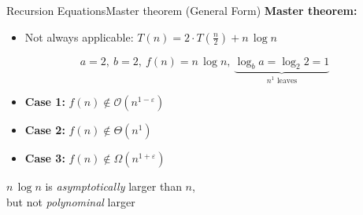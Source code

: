 \begin{frame}{Recursion Equations}{Master theorem (General Form)}
  \textbf{Master theorem:}
  \begin{itemize}
    \item
      Not always applicable:
      {\color{Mittel-Blau}$T(n) = 2 \cdot T(\frac{n}{2}) + n \, \log n$}
  \end{itemize}
  \vspace{1.0em}
  \begin{displaymath}
    a = 2, ~ b = 2, ~ f(n) = n \, \log n, ~
    \underbrace{\log_b a = \log_2 2 = 1}_{\text{$n^1$ leaves}}
  \end{displaymath}
  \begin{itemize}
    \item
      \textbf{Case 1:}
      $f(n) \notin \mathcal{O}(n^{1-\varepsilon})$
    \item
      \textbf{Case 2:}
      $f(n) \notin \Theta(n^1)$
    \item
      \textbf{Case 3:}
      $f(n) \notin \Omega(n^{1+\varepsilon})$
  \end{itemize}
  \begin{center}
    {\color{Mittel-Blau}$n \, \log n$} is \textit{asymptotically} larger than
    {\color{Mittel-Blau}$n$},\\ but not \textit{polynominal} larger
  \end{center}
\end{frame}


